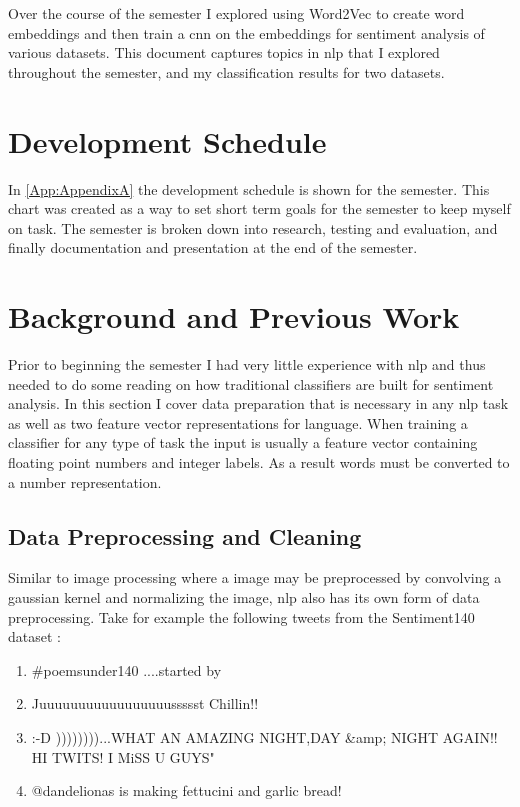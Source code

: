 \documentclass[12pt]{article}
\begin{document}
Over the course of the semester I explored using Word2Vec \cite{word2vec} to create word embeddings and then train a \ac{cnn} on the embeddings for sentiment analysis of various datasets. This document captures topics in \ac{nlp} that I explored throughout the semester, and my classification results for two datasets.

\section{Development Schedule}

In \cref{App:AppendixA} the development schedule is shown for the semester. This chart was created as a way to set short term goals for the semester to keep myself on task. The semester is broken down into research, testing and evaluation, and finally documentation and presentation at the end of the semester. 

\section {Background and Previous Work}
Prior to beginning the semester I had very little experience with \ac{nlp} and thus needed to do some reading on how traditional classifiers are built for sentiment analysis. In this section I cover data preparation that is necessary in any \ac{nlp} task as well as two feature vector representations for language. When training a classifier for any type of task the input is usually a feature vector containing floating point numbers and integer labels. As a result words must be converted to a number representation. 

\subsection {Data Preprocessing and Cleaning}
Similar to image processing where a image may be preprocessed by convolving a gaussian kernel and normalizing the image, \ac{nlp} also has its own form of data preprocessing. Take for example the following tweets from the Sentiment140 dataset \cite{sentiment140}:

\begin{enumerate}
	\item \#poemsunder140 ....started by 
	\item Juuuuuuuuuuuuuuuuussssst Chillin!!
	\item :-D ))))))))...WHAT AN AMAZING NIGHT,DAY \&amp; NIGHT AGAIN!! HI TWITS! I MiSS U GUYS"
	\item @dandelionas is making fettucini and garlic bread!
\end{enumerate} 
\end{document}
